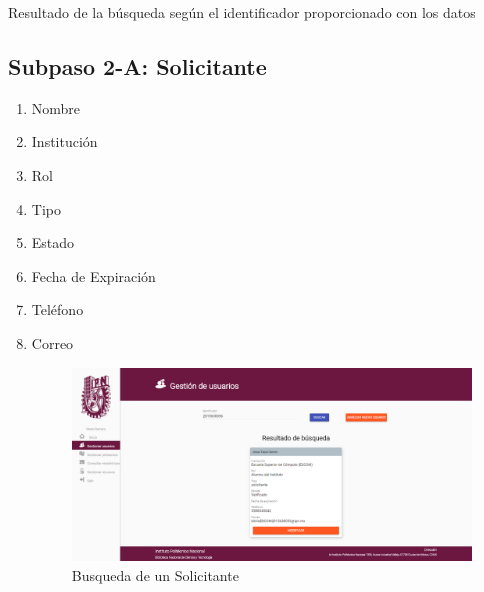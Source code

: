 Resultado de la búsqueda según el identificador proporcionado con los datos

\subsection{Subpaso 2-A: Solicitante}
\begin{enumerate}
	\item Nombre
	\item Institución
	\item Rol
	\item Tipo
	\item Estado
	\item Fecha de Expiración
	\item Teléfono
	\item Correo
	
		\begin{figure}[hbtp]
		
		\includegraphics[scale=0.3]{images/Interfaz/IUGS22_BusquedaSolicitante.png}
		\caption{Busqueda de un Solicitante}
	\end{figure}
\end{enumerate}

